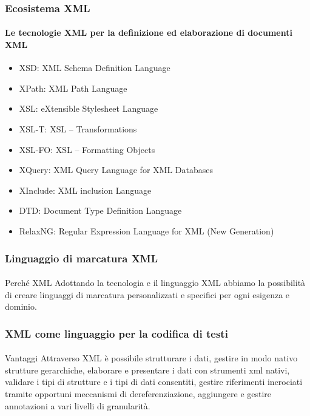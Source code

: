 \begin{frame}
	\frametitle{Ecosistema XML}
	\framesubtitle{Le tecnologie XML per la definizione ed elaborazione di documenti XML}
	\addtocounter{nframe}{1}

	\begin{itemize}
		\item XSD: XML Schema Definition Language
		\item XPath: XML Path Language
		\item XSL: eXtensible Stylesheet Language
		\item XSL-T:  XSL – Transformations
		\item XSL-FO: XSL – Formatting Objects
		\item XQuery: XML Query Language for XML Databases
		\item XInclude: XML inclusion Language
		\item DTD: Document Type Definition Language
		\item RelaxNG: Regular Expression Language for XML (New Generation)
	\end{itemize}

\end{frame}


\begin{frame}
	\frametitle{Linguaggio di marcatura XML}
	\framesubtitle{}
	\addtocounter{nframe}{1}

	\begin{block}{Perché XML}
		Adottando la tecnologia e il linguaggio XML abbiamo la possibilità di creare linguaggi di marcatura personalizzati e specifici per ogni esigenza e dominio.
	\end{block}

\end{frame}

\begin{frame}
	\frametitle{XML come linguaggio per la codifica di testi}
	\framesubtitle{}
	\addtocounter{nframe}{1}

	\begin{block}{Vantaggi}
		Attraverso XML è possibile strutturare i dati, gestire in modo nativo strutture gerarchiche, elaborare e presentare i dati con strumenti xml nativi, validare i tipi di strutture e i tipi di dati consentiti, gestire riferimenti incrociati tramite opportuni meccanismi di dereferenziazione, aggiungere e gestire annotazioni a vari livelli di granularità.
	\end{block}


\end{frame}


